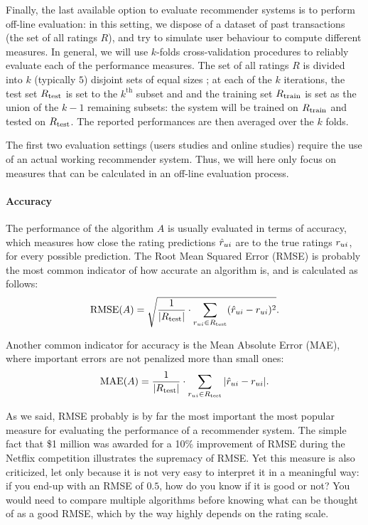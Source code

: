 Finally, the last available option to evaluate recommender systems is to
perform off-line evaluation: in this setting, we dispose of a dataset of past
transactions (the set of all ratings $R$), and try to simulate user behaviour
to compute different measures.  In general, we will use $k$-folds
cross-validation procedures to reliably evaluate each of the performance
measures. The set of all ratings $R$ is divided into $k$ (typically $5$)
disjoint sets of equal sizes ; at each of the $k$ iterations, the test set
$R_{\text{test}}$ is set to the $k^{\text{th}}$ subset and and the training set
$R_{\text{train}}$ is set as the union of the $k - 1$ remaining subsets: the system will
be trained on $R_{\text{train}}$ and tested on $R_{\text{test}}$. The reported performances are
then averaged over the $k$ folds.

The first two evaluation settings (users studies and online studies) require
the use of an actual working recommender system. Thus, we will here only focus
on measures that can be calculated in an off-line evaluation process.

\paragraph{Accuracy\\}
The performance of the algorithm $A$ is usually evaluated in terms of accuracy,
which measures how close the rating predictions $\hat{r}_{ui}$ are to the true
ratings $r_{ui}$, for every possible prediction. The Root Mean Squared Error
(RMSE) is probably the most common indicator of how accurate an algorithm is,
and is calculated as follows:
$$\text{RMSE}(A) = \sqrt{\frac{1}{|R_{\text{test}}|} \cdot \sum_{r_{ui} \in
R_{\text{test}}}(\hat{r}_{ui} - r_{ui})^2}.$$

Another common indicator for accuracy is the Mean Absolute Error (MAE), where
important errors are not penalized more than small ones:
$$\text{MAE}(A) = \frac{1}{|R_{\text{test}}|} \cdot \sum_{r_{ui} \in R_{\text{test}}}|\hat{r}_{ui} -
r_{ui}|.$$

As we said, RMSE probably is by far the most important the most popular measure for
evaluating the performance of a recommender system. The simple fact that \$1
million was awarded for a 10\% improvement of RMSE during the Netflix competition
illustrates the supremacy of RMSE. Yet this measure is also criticized, let
only because it is not very easy to interpret it in a meaningful way: if you
end-up with an RMSE of $0.5$, how do you know if it is good or not? You would
need to compare multiple algorithms before knowing what can be thought of as a
good RMSE, which by the way highly depends on  the rating scale.

